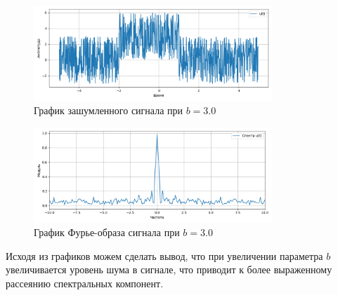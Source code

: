 \documentclass[a4paper]{article}
\begin{document}
\begin{figure}[H]
    \centering
    \includegraphics[width=0.8\textwidth]{src/time_3.0.png}
    \caption{График зашумленного сигнала при $b=3.0$}
\end{figure}
\begin{figure}[H]
    \centering
    \includegraphics[width=0.8\textwidth]{src/spec_3.0.png}
    \caption{График Фурье-образа сигнала при $b=3.0$}
\end{figure}
\noindent
Исходя из графиков можем сделать вывод, что при увеличении параметра $b$ увеличивается уровень шума в сигнале, что приводит к более выраженному рассеянию спектральных компонент.
\end{document}
